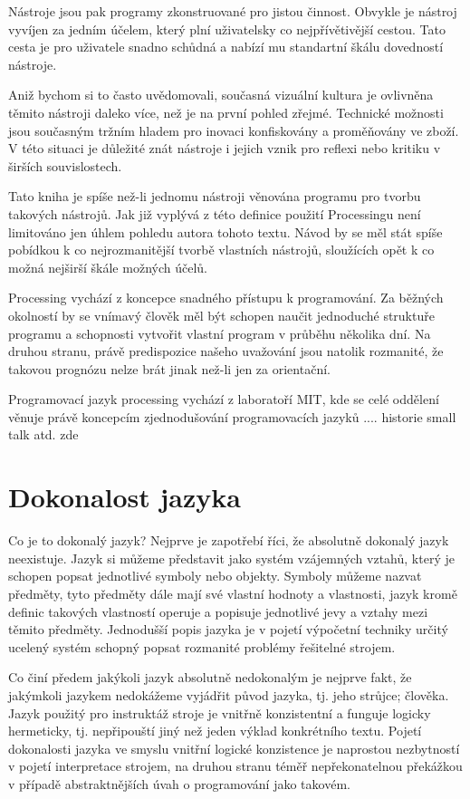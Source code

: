 \documentclass[10pt,twopage]{book}
\newcommand{\oddil}[1]{\section{#1}\label{sec:#1}}
\begin{document}
Nástroje jsou pak programy zkonstruované pro jistou činnost. Obvykle je nástroj vyvíjen za jedním účelem, který plní uživatelsky co nejpřívětivější cestou. Tato cesta je pro uživatele snadno schůdná a nabízí mu standartní škálu dovedností nástroje.

Aniž bychom si to často uvědomovali, současná vizuální kultura je ovlivněna těmito nástroji daleko více, než je na první pohled zřejmé. Technické možnosti jsou současným tržním hladem pro inovaci konfiskovány a proměňovány ve zboží. V této situaci je důležité znát nástroje i jejich vznik pro reflexi nebo kritiku v širších souvislostech.

Tato kniha je spíše než-li jednomu nástroji věnována programu pro tvorbu takových nástrojů. Jak již vyplývá z této definice použití Processingu není limitováno jen úhlem pohledu autora tohoto textu. Návod by se měl stát spíše pobídkou k co nejrozmanitější tvorbě vlastních nástrojů, sloužících opět k co možná nejširší škále možných účelů.

Processing vychází z koncepce snadného přístupu k programování. Za běžných okolností by se vnímavý člověk měl být schopen naučit jednoduché struktuře programu a schopnosti vytvořit vlastní program v průběhu několika dní. Na druhou stranu, právě predispozice našeho uvažování jsou natolik rozmanité, že takovou prognózu nelze brát jinak než-li jen za orientační.


Programovací jazyk processing vychází z laboratoří MIT, kde se celé oddělení věnuje právě koncepcím zjednodušování programovacích jazyků .... historie small talk atd. zde


\oddil{Dokonalost jazyka}

Co je to dokonalý jazyk? Nejprve je zapotřebí říci, že absolutně dokonalý jazyk neexistuje. Jazyk si můžeme představit jako systém vzájemných vztahů, který je schopen popsat jednotlivé symboly nebo objekty. Symboly můžeme nazvat předměty, tyto předměty dále mají své vlastní hodnoty a vlastnosti, jazyk kromě definic takových vlastností operuje a popisuje jednotlivé jevy a vztahy mezi těmito předměty. Jednodušší popis jazyka je v pojetí výpočetní techniky určitý ucelený systém schopný popsat rozmanité problémy řešitelné strojem.

Co činí předem jakýkoli jazyk absolutně nedokonalým je nejprve fakt, že jakýmkoli jazykem nedokážeme vyjádřit původ jazyka, tj. jeho strůjce; člověka. Jazyk použitý pro instruktáž stroje je vnitřně konzistentní a funguje logicky hermeticky, tj. nepřipouští jiný než jeden výklad konkrétního textu. Pojetí dokonalosti jazyka ve smyslu vnitřní logické konzistence je naprostou nezbytností v pojetí interpretace strojem, na druhou stranu téměř nepřekonatelnou překážkou v případě abstraktnějších úvah o programování jako takovém.
\end{document}
